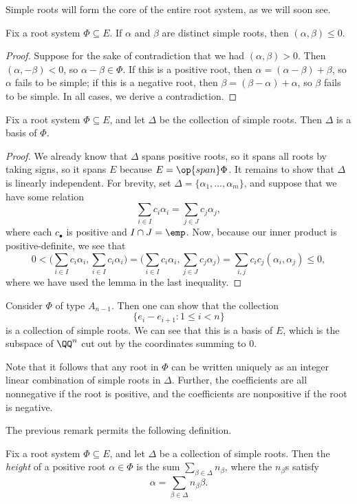\documentclass[../notes.tex]{subfiles}
\begin{document}
Simple roots will form the core of the entire root system, as we will soon see.
\begin{lemma}
	Fix a root system $\Phi\subseteq E$. If $\alpha$ and $\beta$ are distinct simple roots, then $(\alpha,\beta)\le0$.
\end{lemma}
\begin{proof}
	Suppose for the sake of contradiction that we had $(\alpha,\beta)>0$. Then $(\alpha,-\beta)<0$, so $\alpha-\beta\in\Phi$. If this is a positive root, then $\alpha=(\alpha-\beta)+\beta$, so $\alpha$ fails to be simple; if this is a negative root, then $\beta=(\beta-\alpha)+\alpha$, so $\beta$ fails to be simple. In all cases, we derive a contradiction.
\end{proof}
\begin{theorem}
	Fix a root system $\Phi\subseteq E$, and let $\Delta$ be the collection of simple roots. Then $\Delta$ is a basis of $\Phi$.
\end{theorem}
\begin{proof}
	We already know that $\Delta$ spans positive roots, so it spans all roots by taking signs, so it spans $E$ because $E=\op{span}\Phi$. It remains to show that $\Delta$ is linearly independent. For brevity, set $\Delta=\{\alpha_1,\ldots,\alpha_m\}$, and suppose that we have some relation
	\[\sum_{i\in I}c_i\alpha_i=\sum_{j\in J}c_j\alpha_j,\]
	where each $c_\bullet$ is positive and $I\cap J=\emp$. Now, because our inner product is positive-definite, we see that
	\[0<\Bigg(\sum_{i\in I}c_i\alpha_i,\sum_{i\in I}c_i\alpha_i\Bigg)=\Bigg(\sum_{i\in I}c_i\alpha_i,\sum_{j\in J}c_j\alpha_j\Bigg)=\sum_{i,j}c_ic_j(\alpha_i,\alpha_j)\le0,\]
	where we have used the lemma in the last inequality.
\end{proof}
\begin{example}
	Consider $\Phi$ of type $A_{n-1}$. Then one can show that the collection
	\[\{e_i-e_{i+1}:1\le i<n\}\]
	is a collection of simple roots. We can see that this is a basis of $E$, which is the subspace of $\QQ^n$ cut out by the coordinates summing to $0$.
\end{example}
\begin{remark}
	Note that it follows that any root in $\Phi$ can be written uniquely as an integer linear combination of simple roots in $\Delta$. Further, the coefficients are all nonnegative if the root is positive, and the coefficients are nonpositive if the root is negative.
\end{remark}
The previous remark permits the following definition.
\begin{definition}[height]
	Fix a root system $\Phi\subseteq E$, and let $\Delta$ be a collection of simple roots. Then the \textit{height} of a positive root $\alpha\in\Phi$ is the sum $\sum_{\beta\in\Delta}n_\beta$, where the $n_\beta$s satisfy
	\[\alpha=\sum_{\beta\in\Delta}n_\beta\beta.\]
\end{definition}
\end{document}
